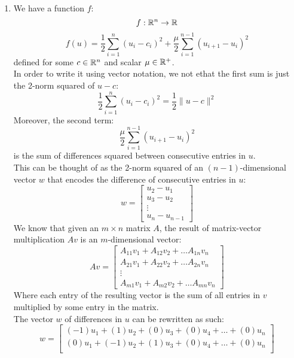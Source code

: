 \documentclass[12pt]{article}
\begin{document}
    \begin{enumerate}[label=\alph*)]
        \item 
        We have a function $f$:
        \[ f:\mathbb{R}^n \to \mathbb{R} \]
        \[ f(u) 
        = \dfrac{1}{2}\sum_{i=1}^{n}(u_i - c_i)^2
        + \dfrac{\mu}{2}\sum_{i=1}^{n-1}(u_{i+1} - u_i)^2
        \]
        defined for some $c \in \mathbb{R}^n$
        and scalar $\mu \in \mathbb{R}^+$. \\
        In order to write it using vector notation,
        we not ethat the first sum is just
        the 2-norm squared of $u - c$:
        \[ \dfrac{1}{2}\sum_{i=1}^{n}(u_i - c_i)^2
        = \dfrac{1}{2}\| u - c \|^2 \]
        Moreover, the second term:
        \[ \dfrac{\mu}{2}
        \sum_{i=1}^{n-1}(u_{i+1} - u_i)^2 \]
        is the sum of differences squared between
        consecutive entries in $u$. \\
        This can be thought of as the 2-norm squared
        of an $(n-1)$-dimensional vector $w$
        that encodes the difference of consecutive
        entries in $u$:
        \[ w = \begin{bmatrix}
            u_2 - u_1 \\
            u_3 - u_2 \\
            \vdots \\
            u_n - u_{n-1}
        \end{bmatrix} \]
        We know that given an $m \times n$
        matrix $A$,
        the result of matrix-vector
        multiplication $Av$ is
        an $m$-dimensional vector:
        \[ Av = \begin{bmatrix}
            A_{11}v_1 + A_{12}v_2 + \dots A_{1n}v_n \\
            A_{21}v_1 + A_{22}v_2 + \dots A_{2n}v_n \\
            \vdots \\
            A_{m1}v_1 + A_{m2}v_2 + \dots A_{mn}v_n
        \end{bmatrix} \]
        Where each entry of the resulting
        vector is the sum of all entries
        in $v$ multiplied by some entry
        in the matrix. \\
        The vector $w$ of differences in $u$
        can be rewritten as such:
        \[ w = \begin{bmatrix}
            (-1)u_1 + (1)u_2 + (0)u_3 + (0)u_4 
            + \dots + (0)u_n \\
            (0)u_1 + (-1)u_2 + (1)u_3 + (0)u_4 
            + \dots + (0)u_n \\

\end{bmatrix}\]
\end{enumerate}
\end{document}
